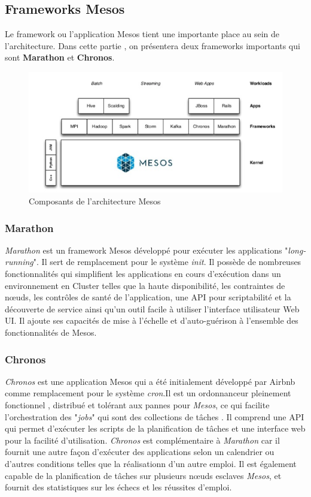 \begin{onehalfspace}
\subsection{Frameworks Mesos}
Le framework ou l'application Mesos tient une importante place au sein de l'architecture. Dans cette partie , on présentera deux frameworks importants qui sont \textbf{Marathon} et \textbf{Chronos}.
\begin{figure}[H]
\centering
\includegraphics [scale=0.65]{chapitre3/assets/framework.png}
\caption{Composants de l'architecture Mesos}
\end{figure}
\subsubsection*{Marathon}
\emph{Marathon} est un framework Mesos développé pour exécuter les applications "\emph{long-running}". Il sert de remplacement pour le système \emph{init}. Il possède de nombreuses fonctionnalités qui simplifient les applications en cours d'exécution dans un environnement en Cluster telles que la haute disponibilité, les contraintes de nœuds, les contrôles de santé de l'application, une API pour scriptabilité et la découverte de service ainsi qu'un outil facile à utiliser l'interface utilisateur Web UI. Il ajoute ses capacités de mise à l'échelle et d'auto-guérison à l'ensemble des fonctionnalités de Mesos. 
\subsubsection*{Chronos}
\emph{Chronos} est une application Mesos qui a été initialement développé par Airbnb comme remplacement pour le système \emph{cron}.Il est un ordonnanceur pleinement fonctionnel , distribué et tolérant aux pannes pour \emph{Mesos}, ce qui facilite l'orchestration des "\emph{jobs}" qui sont des collections de tâches . Il comprend une API qui permet d'exécuter les scripts de la planification de tâches et une interface web pour la facilité d'utilisation.
\emph{Chronos} est complémentaire à \emph{Marathon} car il fournit une autre façon d'exécuter des applications selon un calendrier ou d'autres conditions telles que la réalisationn d'un autre emploi. Il est également capable de la planification de tâches sur plusieurs nœuds esclaves \emph{Mesos}, et fournit des statistiques sur les échecs et les réussites d'emploi.

\end{onehalfspace}
